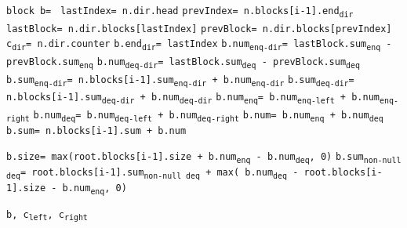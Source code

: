 \documentclass[10pt]{article}
\newcommand\keywordfont{\sffamily\bfseries}
\theoremstyle{definition}
\begin{document}
\begin{algorithm}
\begin{algorithmic}[1]
\begin{multicols}{2}
\Statex{}
\State \texttt{block b= }
\ForEach{\texttt{dir} {\keywordfont{in}} \texttt{\{left, right\}}}
\State \texttt{lastIndex= n.dir.head} \label{lastLine}
\State \texttt{prevIndex= n.blocks[i-1].end\textsubscript{dir}} \label{prevLine}
\State \texttt{lastBlock= n.dir.blocks[lastIndex]}
\State \texttt{prevBlock= n.dir.blocks[prevIndex]}
\State \texttt{c\textsubscript{dir}= n.dir.counter}
\State \texttt{b.end\textsubscript{dir}= lastIndex}
\State \texttt{b.num\textsubscript{enq-dir}= lastBlock.sum\textsubscript{enq} - prevBlock.sum\textsubscript{enq}}
\State \texttt{b.num\textsubscript{deq-dir}= lastBlock.sum\textsubscript{deq} - prevBlock.sum\textsubscript{deq}}
\State \texttt{b.sum\textsubscript{enq-dir}= n.blocks[i-1].sum\textsubscript{enq-dir} + b.num\textsubscript{enq-dir}}
\State \texttt{b.sum\textsubscript{deq-dir}= n.blocks[i-1].sum\textsubscript{deq-dir} + b.num\textsubscript{deq-dir}}
\EndFor
\State \texttt{b.num\textsubscript{enq}= b.num\textsubscript{enq-left} + b.num\textsubscript{enq-right}}
\State \texttt{b.num\textsubscript{deq}= b.num\textsubscript{deq-left} + b.num\textsubscript{deq-right}}
\State \texttt{b.num= b.num\textsubscript{enq} + b.num\textsubscript{deq}}
\State \texttt{b.sum= n.blocks[i-1].sum + b.num}

\State \texttt{b.size= max(root.blocks[i-1].size + b.num\textsubscript{enq} - b.num\textsubscript{deq}, 0)}
\State \texttt{b.sum\textsubscript{non-null deq}= root.blocks[i-1].sum\textsubscript{non-null deq} + max( b.num\textsubscript{deq} - root.blocks[i-1].size - b.num\textsubscript{enq}, 0)}
\EndIf

\State \Return \texttt{b, c\textsubscript{left}, c\textsubscript{right}}

\end{multicols}
\end{algorithmic}
\end{algorithm}
\end{document}
